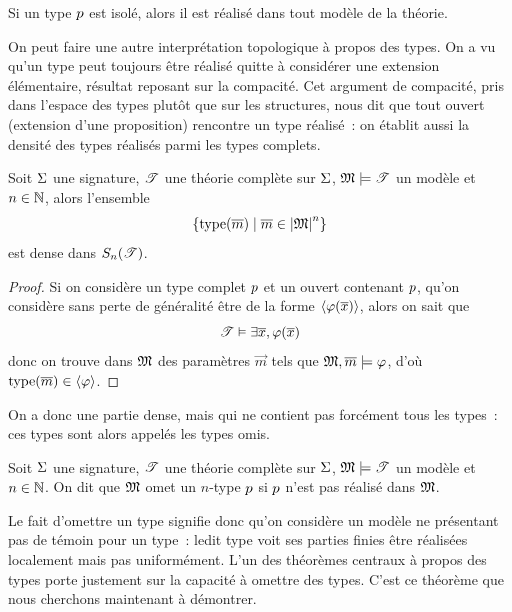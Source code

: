 \begin{remark}
  Si un type $p$ est isolé, alors il est réalisé dans tout modèle de la
  théorie.
\end{remark}

On peut faire une autre interprétation topologique à propos des types. On a vu
qu'un type peut toujours être réalisé quitte à considérer une extension
élémentaire, résultat reposant sur la compacité. Cet argument de compacité, pris
dans l'espace des types plutôt que sur les structures, nous dit que tout ouvert
(extension d'une proposition) rencontre un type réalisé~: on établit aussi la
densité des types réalisés parmi les types complets.

\begin{proposition}
  Soit $\Sigma$ une signature, $\mathscr T$ une théorie complète sur $\Sigma$,
  $\mathfrak{M}\models\mathscr T$ un modèle et $n\in \mathbb N$, alors l'ensemble
  \[\left\{ \operatorname{type}(\overline{m}) \;\middle\vert\; \overline{m} \in \left\vert \mathfrak{M}\right\vert^n \right\}\]
  est dense dans $S_{n}(\mathscr T)$.
\end{proposition}

\begin{proof}
  Si on considère un type complet $p$ et un ouvert contenant
  $p$, qu'on considère sans perte de généralité être de la forme
  $\langle\varphi(\overline{x})\rangle$, alors on sait que
  \[\mathscr T\vDash\exists \overline{x}, \varphi(\overline{x})\]
  donc on trouve dans $\mathfrak{M}$ des paramètres $\vec m$ tels que
  $\mathfrak{M},\overline{m} \models\varphi$, d'où $\operatorname{type}(\overline{m})\in\langle\varphi\rangle$.
\end{proof}

On a donc une partie dense, mais qui ne contient pas forcément tous les types~:
ces types sont alors appelés les types omis.

\begin{definition}
  Soit $\Sigma$ une signature, $\mathscr T$ une théorie complète sur $\Sigma$,
  $\mathfrak{M}\models\mathscr T$ un modèle et $n\in\mathbb N$. On dit que $\mathfrak{M}$ omet un
  $n$-type $p$ si $p$ n'est pas réalisé dans $\mathfrak{M}$.
\end{definition}

Le fait d'omettre un type signifie donc qu'on considère un modèle ne présentant
pas de témoin pour un type~: ledit type voit ses parties finies être réalisées
localement mais pas uniformément. L'un des théorèmes centraux à propos des types
porte justement sur la capacité à omettre des types. C'est ce théorème que nous
cherchons maintenant à démontrer.

